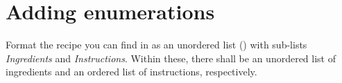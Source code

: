 \section{Adding enumerations}

Format the recipe you can find in  as an 
unordered list () with sub-lists \emph{Ingredients} 
and \emph{Instructions}. 
Within these, there shall be an unordered list of ingredients and an ordered list of 
instructions, respectively.
